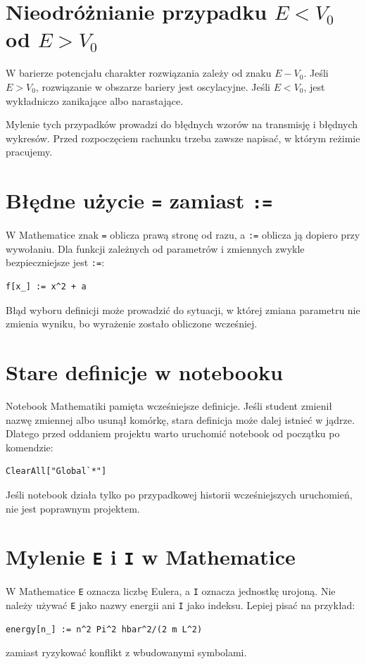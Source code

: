 \section{Nieodróżnianie przypadku \texorpdfstring{\(E<V_0\)}{E<V0} od \texorpdfstring{\(E>V_0\)}{E>V0}}

W barierze potencjału charakter rozwiązania zależy od znaku \(E-V_0\). Jeśli
\(E>V_0\), rozwiązanie w obszarze bariery jest oscylacyjne. Jeśli \(E<V_0\), jest
wykładniczo zanikające albo narastające.

Mylenie tych przypadków prowadzi do błędnych wzorów na transmisję i błędnych
wykresów. Przed rozpoczęciem rachunku trzeba zawsze napisać, w którym reżimie
pracujemy.

\section{Błędne użycie \texttt{=} zamiast \texttt{:=}}

W Mathematice znak \texttt{=} oblicza prawą stronę od razu, a \texttt{:=} oblicza ją
dopiero przy wywołaniu. Dla funkcji zależnych od parametrów i zmiennych zwykle
bezpieczniejsze jest \texttt{:=}:
\begin{verbatim}
f[x_] := x^2 + a
\end{verbatim}
Błąd wyboru definicji może prowadzić do sytuacji, w której zmiana parametru nie
zmienia wyniku, bo wyrażenie zostało obliczone wcześniej.

\section{Stare definicje w notebooku}

Notebook Mathematiki pamięta wcześniejsze definicje. Jeśli student zmienił nazwę
zmiennej albo usunął komórkę, stara definicja może dalej istnieć w jądrze.
Dlatego przed oddaniem projektu warto uruchomić notebook od początku po komendzie:
\begin{verbatim}
ClearAll["Global`*"]
\end{verbatim}
Jeśli notebook działa tylko po przypadkowej historii wcześniejszych uruchomień,
nie jest poprawnym projektem.

\section{Mylenie \texttt{E} i \texttt{I} w Mathematice}

W Mathematice \texttt{E} oznacza liczbę Eulera, a \texttt{I} oznacza jednostkę
urojoną. Nie należy używać \texttt{E} jako nazwy energii ani \texttt{I} jako indeksu.
Lepiej pisać na przykład:
\begin{verbatim}
energy[n_] := n^2 Pi^2 hbar^2/(2 m L^2)
\end{verbatim}
zamiast ryzykować konflikt z wbudowanymi symbolami.

